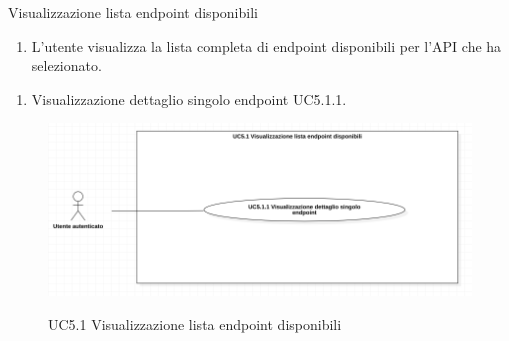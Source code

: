 \begin{usecase}{5.1}{Visualizzazione lista endpoint disponibili}\label{uc:visualizzazione-lista-endpoint-disponibili}

    \usecasemain{}
        \begin{enumerate}
            \item L'utente visualizza la lista completa di endpoint disponibili per l'API che ha selezionato.
        \end{enumerate}

    \usecasegen{}
        \begin{enumerate}
            \item Visualizzazione dettaglio singolo endpoint UC5.1.1.
        \end{enumerate}

\end{usecase}

\begin{figure}[!ht] 
    \centering 
    \includegraphics[width=0.9\columnwidth, alt={Caso d'uso relativo al visualizzazione della lista di endpoint disponibili}]{images/usecase/UC5.1.jpg}
    \caption{UC5.1 Visualizzazione lista endpoint disponibili}\label{fig:uc:visualizzazione-lista-endpoint-disponibili}
  \end{figure}


